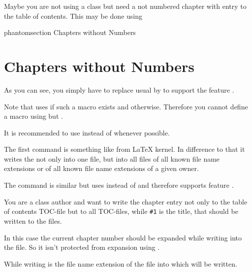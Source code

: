 \begin{Example}
  Maybe you are not using a \KOMAScript{} class but need a not numbered
  chapter with entry to the table of contents. This may be done using
\begin{lstcode}
  \cleardoublepage
  \csname phantomsection\endcsname
             {Chapters without Numbers}
  \chapter*{Chapters without Numbers}
\end{lstcode}
  As you can see, you simply have to replace usual  by
   to support the  feature
  .
\end{Example}

Note that  uses
 if such a macro exists and
 otherwise. Therefore you cannot define
a macro  using
 but .

It is recommended to use  instead of
 whenever possible.%
\EndIndexGroup


\begin{Declaration}
\end{Declaration}
The first command is something like  from \LaTeX{}
kernel. In difference to that it writes the  not only into
one file, but into all files of all known file name extensions or of all known
file name extensions of a given owner.

The command  is similar but uses
 instead of  and
therefore supports  feature .
\begin{Example}
  You are a class author and want to write the chapter entry not only to the
  table of contents TOC-file but to all TOC-files, while \texttt{\#1} is the
  title, that should be written to the files.
  In this case the current chapter number should be expanded while writing
  into the file. So it isn't protected from expansion using .
\end{Example}
While writing 
is the file name extension of the file into which  will be
written.

